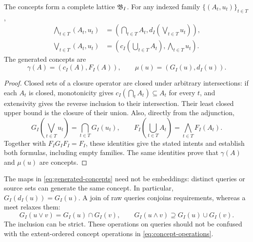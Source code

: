 \begin{theorem}
      \label{thm:concept-lattice}
      The concepts form a complete lattice $\mathfrak{B}_{I}$. For any indexed family
      $\{(A_{t},u_{t})\}_{t\in T}$,
      \begin{equation}\label{eq:concept-operations}
            \begin{aligned}
                  \bigwedge_{t\in T}(A_{t},u_{t})
                   & =\left(\bigcap_{t\in T}A_{t},
                  d_{I}(\bigvee_{t\in T}u_{t})\right),    \\
                  \bigvee_{t\in T}(A_{t},u_{t})
                   & =\left(c_{I}(\bigcup_{t\in T}A_{t}),
                  \bigwedge_{t\in T}u_{t}\right).
            \end{aligned}
      \end{equation}
      The generated concepts are
      \begin{equation}\label{eq:generated-concepts}
            \gamma(A)=(c_{I}(A),F_{I}(A)),\qquad
            \mu(u)=(G_{I}(u),d_{I}(u)).
      \end{equation}
\end{theorem}
\begin{proof}
      Closed sets of a closure operator are closed under arbitrary
      intersections: if each $A_{t}$ is closed, monotonicity gives
      $c_{I}(\bigcap_{t}A_{t})\subseteq A_{t}$ for every $t$, and extensivity
      gives the reverse inclusion to their intersection. Their least closed
      upper bound is the closure of their union. Also, directly from the
      adjunction,
      \begin{equation}\label{eq:derivation-family}
            G_{I}(\bigvee_{t\in T}u_{t})=\bigcap_{t\in T}G_{I}(u_{t}),\qquad
            F_{I}(\bigcup_{t\in T}A_{t})=\bigwedge_{t\in T}F_{I}(A_{t}).
      \end{equation}
      Together with $F_{I}G_{I}F_{I}=F_{I}$, these identities give the stated
      intents and establish both formulas, including empty families. The same
      identities prove that $\gamma(A)$ and $\mu(u)$ are concepts.
\end{proof}

The maps in \cref{eq:generated-concepts} need not be embeddings: distinct
queries or source sets can generate the same concept. In particular,
$G_{I}(d_{I}(u))=G_{I}(u)$. A join of raw queries conjoins requirements,
whereas a meet relaxes them:
\begin{equation}\label{eq:query-operations}
      G_{I}(u\vee v)=G_{I}(u)\cap G_{I}(v),\qquad
      G_{I}(u\wedge v)\supseteq G_{I}(u)\cup G_{I}(v).
\end{equation}
The inclusion can be strict. These operations on queries should not be
confused with the extent-ordered concept operations in
\cref{eq:concept-operations}.

